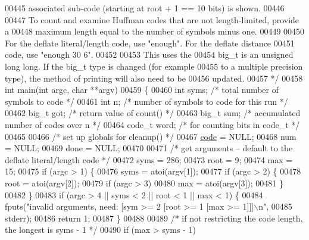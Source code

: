 \begin{DoxyCode}
{{{00445 \textcolor{comment}{   associated sub-code (starting at root + 1 == 10 bits) is shown.}
00446 \textcolor{comment}{}
00447 \textcolor{comment}{   To count and examine Huffman codes that are not length-limited, provide a}
00448 \textcolor{comment}{   maximum length equal to the number of symbols minus one.}
00449 \textcolor{comment}{}
00450 \textcolor{comment}{   For the deflate literal/length code, use "enough".  For the deflate distance}
00451 \textcolor{comment}{   code, use "enough 30 6".}
00452 \textcolor{comment}{}
00453 \textcolor{comment}{   This uses the %
00454 \textcolor{comment}{   big\_t is an unsigned long long.  If the big\_t type is changed (for example}
00455 \textcolor{comment}{   to a multiple precision type), the method of printing will also need to be}
00456 \textcolor{comment}{   updated.}
00457 \textcolor{comment}{ */}
00458 \textcolor{keywordtype}{int} main(\textcolor{keywordtype}{int} argc, \textcolor{keywordtype}{char} **argv)
00459 \{
00460     \textcolor{keywordtype}{int} syms;           \textcolor{comment}{/* total number of symbols to code */}
00461     \textcolor{keywordtype}{int} n;              \textcolor{comment}{/* number of symbols to code for this run */}
00462     big\_t got;          \textcolor{comment}{/* return value of count() */}
00463     big\_t sum;          \textcolor{comment}{/* accumulated number of codes over n */}
00464     code\_t word;        \textcolor{comment}{/* for counting bits in code\_t */}
00465 
00466     \textcolor{comment}{/* set up globals for cleanup() */}
00467     \hyperlink{structcode}{code} = NULL;
00468     num = NULL;
00469     done = NULL;
00470 
00471     \textcolor{comment}{/* get arguments -- default to the deflate literal/length code */}
00472     syms = 286;
00473     root = 9;
00474     max = 15;
00475     \textcolor{keywordflow}{if} (argc > 1) \{
00476         syms = atoi(argv[1]);
00477         \textcolor{keywordflow}{if} (argc > 2) \{
00478             root = atoi(argv[2]);
00479             \textcolor{keywordflow}{if} (argc > 3)
00480                 max = atoi(argv[3]);
00481         \}
00482     \}
00483     \textcolor{keywordflow}{if} (argc > 4 || syms < 2 || root < 1 || max < 1) \{
00484         fputs(\textcolor{stringliteral}{"invalid arguments, need: [sym >= 2 [root >= 1 [max >= 1]]]\(\backslash\)n"},
00485               stderr);
00486         \textcolor{keywordflow}{return} 1;
00487     \}
00488 
00489     \textcolor{comment}{/* if not restricting the code length, the longest is syms - 1 */}
00490     \textcolor{keywordflow}{if} (max > syms - 1)
}}}}
\end{DoxyCode}
